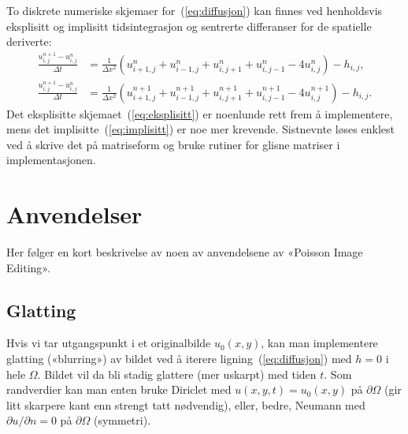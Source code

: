 \documentclass[11pt,a4paper]{article}
\begin{document}
To diskrete numeriske skjemaer for~(\ref{eq:diffusjon}) kan finnes ved
henholdsvis eksplisitt og implisitt tidsintegrasjon og sentrerte
differanser for de spatielle deriverte:
\begin{align}
  \frac{u^{n+1}_{i,j} - u^n_{i,j}}{\Delta t} &= \frac{1}{\Delta x^2}
                                               (u^n_{i+1,j} +
                                               u^n_{i-1,j} +
                                               u^n_{i,j+1} +
                                               u^n_{i,j-1} -4 
                                               u^n_{i,j}) - h_{i,j},
                                               \label{eq:eksplisitt}  \\
  \frac{u^{n+1}_{i,j} - u^n_{i,j}}{\Delta t} &= \frac{1}{\Delta x^2}
                                               (u^{n+1}_{i+1,j} +
                                               u^{n+1}_{i-1,j} +
                                               u^{n+1}_{i,j+1} +
                                               u^{n+1}_{i,j-1} -4 
                                               u^{n+1}_{i,j}) - h_{i,j}.
                                               \label{eq:implisitt}
\end{align}
Det eksplisitte skjemaet~(\ref{eq:eksplisitt}) er noenlunde rett frem
å implementere, mens det implisitte~(\ref{eq:implisitt}) er noe mer
krevende. Sistnevnte løses enklest ved å skrive det på matriseform og
bruke rutiner for glisne matriser i implementasjonen.

\section{Anvendelser}
\label{sec:anvendelser}

Her følger en kort beskrivelse av noen av anvendelsene av «Poisson
Image Editing».

\subsection{Glatting}
\label{sec:glatting}

Hvis vi tar utgangspunkt i et originalbilde $u_0(x, y)$, kan man
implementere glatting («blurring») av bildet ved å iterere
ligning~(\ref{eq:diffusjon}) med $h = 0$ i hele $\Omega$. Bildet vil
da bli stadig glattere (mer uskarpt) med tiden $t$. Som randverdier
kan man enten bruke Diriclet med $u(x, y, t) = u_0(x, y)$ på
$\partial\Omega$ (gir litt skarpere kant enn strengt tatt nødvendig),
eller, bedre, Neumann med $\partial u/\partial n = 0$ på
$\partial\Omega$ (symmetri).
\end{document}
